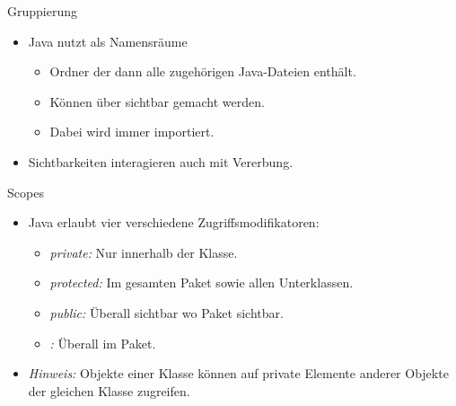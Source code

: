 {\begin{frame}[c]{Gruppierung}
   \begin{itemize}[<+(1)->]
      \itemsep14pt
      \item Java nutzt  als Namensräume \begin{itemize}
         \item Ordner der dann alle zugehörigen Java-Dateien enthält.
         \item Können über  sichtbar gemacht werden.
         \item Dabei wird  immer importiert.
      \end{itemize}
      \item Sichtbarkeiten interagieren auch mit Vererbung.
   \end{itemize}
\end{frame}


\begin{frame}[c]{Scopes}
   \begin{itemize}[<+(1)->]
      \itemsep13pt
      \item Java erlaubt vier verschiedene Zugriffsmodifikatoren: \begin{itemize}
         \item \textit{private:} Nur innerhalb der Klasse.
         \item \textit{protected:} Im gesamten Paket sowie allen Unterklassen.
         \item \textit{public:} Überall sichtbar wo Paket sichtbar.
         \item \textit{:} Überall im Paket.
     \end{itemize}
     \item \textit{Hinweis:} Objekte einer Klasse können auf private Elemente anderer Objekte der gleichen Klasse zugreifen.
   \end{itemize}
\end{frame}


}
